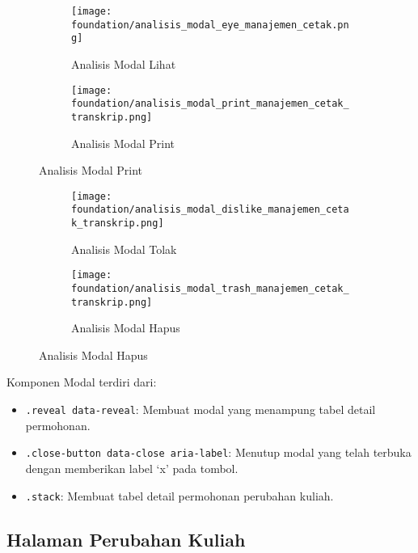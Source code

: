 \begin{figure}	
	\centering
	\begin{subfigure}[t]{3in}
		\centering  
		\texttt{[image: foundation/analisis\_modal\_eye\_manajemen\_cetak.png]}
		\caption{Analisis Modal Lihat} 
	\end{subfigure}
	\quad
	\begin{subfigure}[t]{3in}
		\centering  
		\texttt{[image: foundation/analisis\_modal\_print\_manajemen\_cetak\_transkrip.png]}
		\caption{Analisis Modal Print} 
	\end{subfigure}
\end{figure}
\begin{figure}	
	\centering
	\begin{subfigure}[t]{3in}
		\centering 
		\texttt{[image: foundation/analisis\_modal\_dislike\_manajemen\_cetak\_transkrip.png]}
		\caption{Analisis Modal Tolak}  
	\end{subfigure}
	\quad
	\begin{subfigure}[t]{3in}		  
		\centering  
		\texttt{[image: foundation/analisis\_modal\_trash\_manajemen\_cetak\_transkrip.png]}
		\caption{Analisis Modal Hapus}
	\end{subfigure}
\end{figure}

Komponen Modal terdiri dari:
\begin{itemize}
	\item \texttt{.reveal data-reveal}: Membuat modal yang menampung tabel detail permohonan.
	\item \texttt{.close-button data-close aria-label}: Menutup modal yang telah terbuka dengan memberikan label `x' pada tombol.
	\item \texttt{.stack}:	Membuat tabel detail permohonan perubahan kuliah.
\end{itemize}


\subsection{Halaman Perubahan Kuliah}
